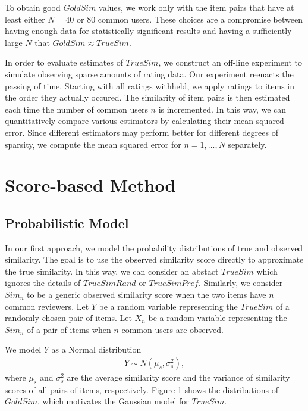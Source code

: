 \documentclass[11pt]{article}
\begin{document}
To obtain good $GoldSim$ values, we work only with the item pairs that have at
least either $N=40$ or $80$ common users. These choices are a compromise between
having enough data for statistically significant results and having a
sufficiently large $N$ that $GoldSim \approx TrueSim$. 

In order to evaluate estimates of $TrueSim$, we construct an off-line experiment
to simulate observing sparse amounts of rating data. Our experiment reenacts the
passing of time. Starting with all ratings withheld, we apply ratings to items
in the order they actually occured. The similarity of item pairs is then
estimated each time the number of common users $n$ is incremented. In this way,
we can quantitatively compare various estimators by calculating their mean
squared error. Since different estimators may perform better for different
degrees of sparsity, we compute the mean squared error for $n=1,...,N$
separately.

\section*{Score-based Method}
\subsection*{Probabilistic Model}

In our first approach, we model the probability distributions of true and
observed similarity. The goal is to use the observed similarity score directly
to approximate the true similarity. In this way, we can consider an abstact
$TrueSim$ which ignores the details of $TrueSimRand$ or $TrueSimPref$.
Similarly, we consider $Sim_n$ to be a generic observed similarity score when
the two items have $n$ common reviewers. Let $Y$ be a random variable
representing the $TrueSim$ of a randomly chosen pair of items. Let $X_{n}$ be a
random variable representing the $Sim_{n}$ of a pair of items when $n$ common
users are observed.

We model $Y$ as a Normal distribution 
\begin{align}
Y \sim N(\mu_s, \sigma_{s}^2),
\end{align}
where $\mu_s$ and $\sigma_{s}^2$ are the average similarity score and the variance
of similarity scores of all pairs of items, respectively. Figure 1 shows the
distributions of $GoldSim$, which motivates the Gaussian model for $TrueSim$.
\end{document}
